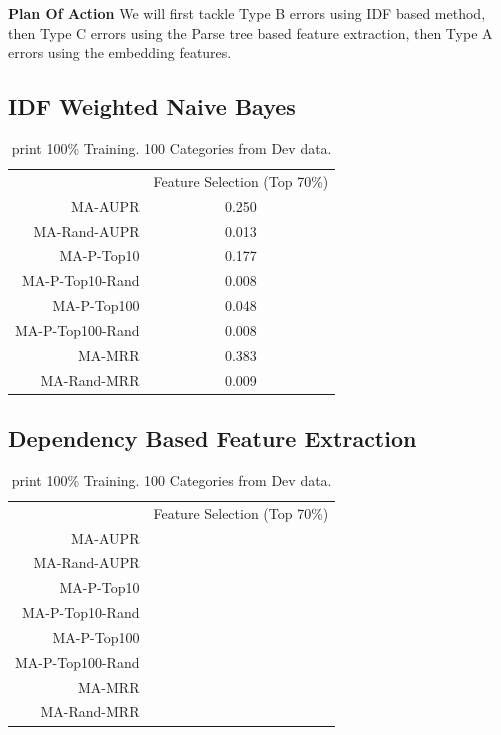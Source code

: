 \documentclass{article}
\begin{document}
\begin{notebox}
  \textbf{Plan Of Action}
  We will first tackle Type B errors using IDF based method,
  then Type C errors using the Parse tree based feature extraction,
  then Type A errors using the embedding features.
\end{notebox}

\subsection{IDF Weighted Naive Bayes}
\label{ssec:results-idf-weighted-naive}
\begin{table}[htbp]
  \centering
{}
  \begin{tabular}{r  c}\toprule
                 & Feature Selection (Top 70\%) \\
MA-AUPR          & 0.250                        \\
MA-Rand-AUPR     & 0.013                        \\
MA-P-Top10       & 0.177                        \\
MA-P-Top10-Rand  & 0.008                        \\
MA-P-Top100      & 0.048                        \\
MA-P-Top100-Rand & 0.008                        \\
MA-MRR           & 0.383                        \\
MA-Rand-MRR      & 0.009                        \\
\bottomrule\end{tabular}
  \caption{print 100\% Training. 100 Categories from Dev data.}
  \label{tab:summary-idf-weighted-naive}
\end{table}

\subsection{Dependency Based Feature Extraction}
\label{ssec:results-dependency}
\begin{table}[htbp]
  \centering
{}
  \begin{tabular}{r  c   }\toprule
                 & Feature Selection (Top 70\%) \\
MA-AUPR          &                         \\
MA-Rand-AUPR     &                         \\
MA-P-Top10       &                         \\
MA-P-Top10-Rand  &                         \\
MA-P-Top100      &                         \\
MA-P-Top100-Rand &                         \\
MA-MRR           &                         \\
MA-Rand-MRR      &                         \\
\bottomrule\end{tabular}
  \caption{print 100\% Training. 100 Categories from Dev data.}
  \label{tab:summary-dependency}
\end{table}
\end{document}
